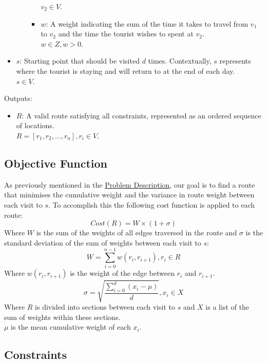 \begin{itemize}
\begin{itemize}
\begin{itemize}
            $v_2 \in V$.
            \item[\textbullet]$w$: A weight indicating the sum of the time it takes to travel from $v_1$ to $v_2$
            and the time the tourist wishes to spent at $v_2$.\\
            $w \in Z, w > 0$.
        \end{itemize}
    \end{itemize}
    \item $s$: Starting point that should be visited $d$ times.
    Contextually, $s$ represents where the tourist is staying and will return to at the end of each day.\\
    $s \in V$.
\end{itemize}
Outputs:
    \begin{itemize}
    \item $R$: A valid route satisfying all constraints, represented as an ordered sequence of locations.\\
    $R = [r_1, r_2, \dots, r_n], r_i \in V$.
\end{itemize}

\subsection{Objective Function}\label{subsec:objective-function}
As previously mentioned in the \hyperref[subsec:problem-description]{Problem Description}, our goal is to find a
route that minimises the cumulative weight and the variance in route weight between each visit to $s$.
To accomplish this the following cost function is applied to each route:
\begin{equation}
    Cost(R) = W \times (1 + \sigma)\label{eq:cost}
\end{equation}
Where $W$ is the sum of the weights of all edges traversed in the route and $\sigma$ is the standard deviation of the
sum of weights between each visit to $s$:
\begin{equation}
    W = \sum_{i=0}^{n-1} w(r_i, r_{i+1}), r_i \in R\label{eq:weight}
\end{equation}
Where $w(r_i, r_{i+1})$ is the weight of the edge between $r_i$ and $r_{i+1}$.
\begin{equation}
    \sigma = \sqrt{\frac{\sum_{i=0}^{d}(x_i-\mu)}{d}}, x_i \in X\label{eq:standard-deviation}
\end{equation}
Where $R$ is divided into sections between each visit to $s$ and $X$ is a list of the sum of weights within these
sections.\\
$\mu$ is the mean cumulative weight of each $x_i$.

\subsection{Constraints}\label{subsec:constraints}
